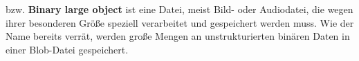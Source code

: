 bzw. \textbf{Binary large object} ist eine Datei, meist Bild- oder Audiodatei, die wegen
ihrer besonderen Größe speziell verarbeitet und gespeichert werden muss. Wie der Name bereits verrät,
werden große Mengen an unstrukturierten binären Daten in einer Blob-Datei gespeichert.